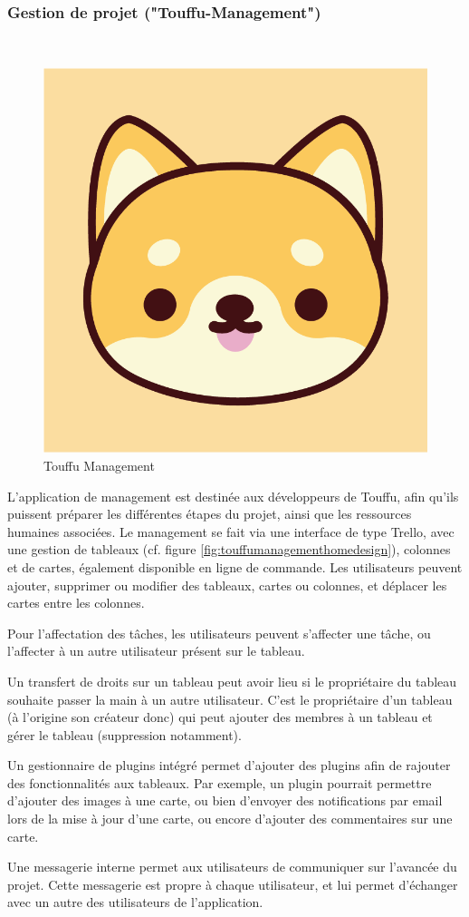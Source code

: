 \documentclass[conference]{IEEEtran}
\begin{document}
\subsubsection{Gestion de projet ("Touffu-Management")}\hfil\\

\begin{figure}[h]
	\centering
	\includegraphics[width=0.4\columnwidth]{Ressources/Icons/v1_1@3x.png}
	\caption{Touffu Management}
	\label{fig:logotouffu-management}
\end{figure}

L'application de management est destinée aux développeurs de Touffu, afin qu'ils puissent préparer les différentes étapes du projet, ainsi que les ressources humaines associées. Le management se fait via une interface de type Trello, avec une gestion de tableaux (cf. figure \ref{fig:touffumanagementhomedesign}), colonnes et de cartes, également disponible en ligne de commande. Les utilisateurs peuvent ajouter, supprimer ou modifier des tableaux, cartes ou colonnes, et déplacer les cartes entre les colonnes.

Pour l'affectation des tâches, les utilisateurs peuvent s'affecter une tâche, ou l'affecter à un autre utilisateur présent sur le tableau.

Un transfert de droits sur un tableau peut avoir lieu si le propriétaire du tableau souhaite passer la main à un autre utilisateur. C'est le propriétaire d'un tableau (à l'origine son créateur donc) qui peut ajouter des membres à un tableau et gérer le tableau (suppression notamment).

Un gestionnaire de plugins intégré permet d'ajouter des plugins afin de rajouter des fonctionnalités aux tableaux. Par exemple, un plugin pourrait permettre d'ajouter des images à une carte, ou bien d'envoyer des notifications par email lors de la mise à jour d'une carte, ou encore d'ajouter des commentaires sur une carte.

Une messagerie interne permet aux utilisateurs de communiquer sur l'avancée du projet. Cette messagerie est propre à chaque utilisateur, et lui permet d'échanger avec un autre des utilisateurs de l'application.
\end{document}
